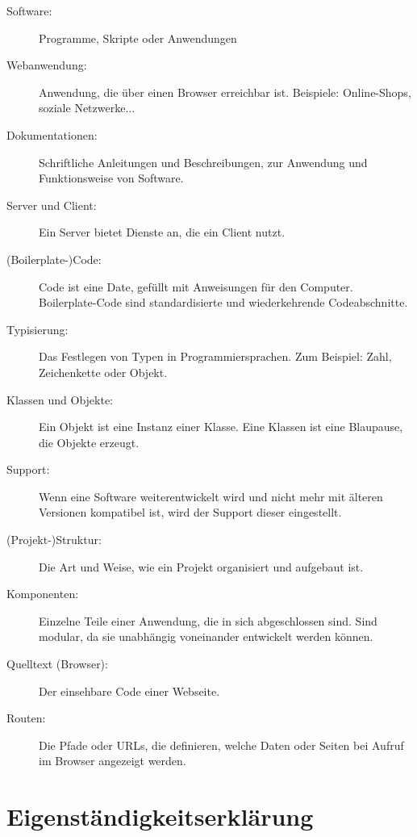 \documentclass[biblatex]{lni}
\begin{document}
\begin{description}
  \item[Software:] Programme, Skripte oder Anwendungen

  \item[Webanwendung:] Anwendung, die über einen Browser erreichbar ist. Beispiele: Online-Shops, soziale Netzwerke...

  \item[Dokumentationen:] Schriftliche Anleitungen und Beschreibungen, zur Anwendung und Funktionsweise von Software.

  \item[Server und Client:] Ein Server bietet Dienste an, die ein Client nutzt.

  \item[(Boilerplate-)Code:] Code ist eine Date, gefüllt mit Anweisungen für den Computer. Boilerplate-Code sind standardisierte und wiederkehrende Codeabschnitte.

  \item[Typisierung:] Das Festlegen von Typen in Programmiersprachen. Zum Beispiel: Zahl, Zeichenkette oder Objekt.

  \item[Klassen und Objekte:] Ein Objekt ist eine Instanz einer Klasse. Eine Klassen ist eine Blaupause, die Objekte erzeugt.

  \item[Support:] Wenn eine Software weiterentwickelt wird und nicht mehr mit älteren Versionen kompatibel ist, wird der Support dieser eingestellt.

  \item[(Projekt-)Struktur:] Die Art und Weise, wie ein Projekt organisiert und aufgebaut ist.

  \item[Komponenten:] Einzelne Teile einer Anwendung, die in sich abgeschlossen sind. Sind modular, da sie unabhängig voneinander entwickelt werden können.

  \item[Quelltext (Browser):] Der einsehbare Code einer Webseite.

  \item[Routen:] Die Pfade oder URLs, die definieren, welche Daten oder Seiten bei Aufruf im Browser angezeigt werden.

\end{description}

\newpage

\section*{\centering Eigenständigkeitserklärung}
\end{document}

